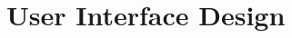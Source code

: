 \documentclass[../DD0.tex]{subfiles}
\begin{document}
\section {User Interface Design}
\label{sec:userdes}
\end{document}
